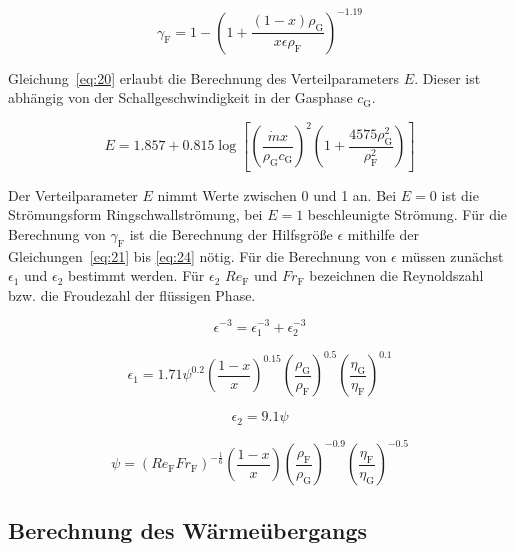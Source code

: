 \begin{equation}
\label{eq:19}
\gamma_\mathrm{F} = 1 - \left(1+\frac{(1-x)\rho_\mathrm{G}}{x \epsilon \rho_\mathrm{F}}\right)^{-1.19}
\end{equation}


Gleichung~\ref{eq:20} erlaubt die Berechnung des Verteilparameters $E$. Dieser ist abhängig von der Schallgeschwindigkeit in der Gasphase $c_\mathrm{G}$.

\begin{equation}
\label{eq:20}
E = 1.857 + 0.815 \log\left[\left(\frac{\dot{m} x}{\rho_\mathrm{G} c_\mathrm{G}}\right)^2 \left( 1+ \frac{4575 \rho_\mathrm{G}^2}{\rho_\mathrm{F}^2} \right)\right]
\end{equation}

Der Verteilparameter $E$ nimmt Werte zwischen 0 und 1 an. Bei $E=0$ ist die Strömungsform Ringschwallströmung, bei $E=1$ beschleunigte Strömung.
Für die Berechnung von $\gamma_\mathrm{F}$ ist die Berechnung der Hilfsgröße $\epsilon$ mithilfe der Gleichungen~\ref{eq:21} bis \ref{eq:24} nötig. Für die Berechnung von $\epsilon$ müssen zunächst $\epsilon_1$ und $\epsilon_2$ bestimmt werden. Für $\epsilon_2$ $Re_\mathrm{F}$ und $Fr_\mathrm{F}$ bezeichnen die Reynoldszahl bzw. die Froudezahl der flüssigen Phase.

\begin{equation}
\label{eq:21}
\epsilon^{-3} = \epsilon_1^{-3} + \epsilon_2^{-3}
\end{equation}

\begin{equation}
\label{eq:22}
\epsilon_1 = 1.71 \psi^{0.2} \left( \frac{1-x}{x} \right)^{0.15} \left( \frac{\rho_\mathrm{G}}{\rho_\mathrm{F}} \right)^{0.5} \left( \frac{\eta_\mathrm{G}}{\eta_\mathrm{F}} \right)^{0.1}
\end{equation}

\begin{equation}
\label{eq:23}
\epsilon_2 = 9.1 \psi
\end{equation}

\begin{equation}
\label{eq:24}
\psi = (Re_\mathrm{F} Fr_\mathrm{F})^{-\frac{1}{6}} \left( \frac{1-x}{x} \right) \left(\frac{\rho_\mathrm{F}}{\rho_\mathrm{G}} \right)^{-0.9} \left(\frac{\eta_\mathrm{F}}{\eta_\mathrm{G}} \right)^{-0.5}
\end{equation}

\subsection{Berechnung des Wärmeübergangs}
\label{subsec:Berechnung des Wärmeübergangs}

